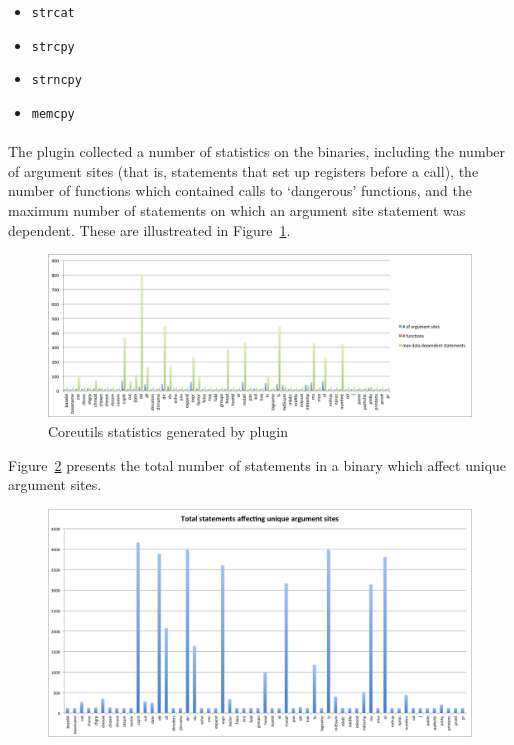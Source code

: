 \documentclass[letterpaper,11pt]{article}
\begin{document}
\begin{itemize}
  \item \texttt{strcat}
  \item \texttt{strcpy}
  \item \texttt{strncpy}
  \item \texttt{memcpy}
\end{itemize}

\paragraph{}
The plugin collected a number of statistics on the binaries, including
the number of argument sites (that is, statements that set up registers
before a call), the number of functions which contained calls to `dangerous'
functions, and the maximum number of statements on which an argument
site statement was dependent. These are illustreated in Figure~\ref{fig:corestats}.

\begin{figure}[ht!]
\centering
\includegraphics[scale=0.55, trim=0mm 0mm 0mm 0mm, clip]{img/coreutils2.pdf}
\caption{Coreutils statistics generated by plugin}
\label{fig:corestats}
\end{figure}

Figure~\ref{fig:coretotal} presents the total number of statements in a binary
which affect unique argument sites.

\begin{figure}[ht!]
\centering
\includegraphics[scale=0.45, trim=0mm 0mm 0mm 0mm, clip]{img/coreutilstotal.pdf}
\label{fig:coretotal}
\end{figure}
\end{document}
